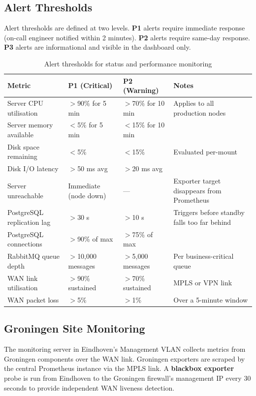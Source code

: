 \subsection{Alert Thresholds}

Alert thresholds are defined at two levels. \textbf{P1} alerts require immediate response (on-call engineer notified within 2 minutes). \textbf{P2} alerts require same-day response. \textbf{P3} alerts are informational and visible in the dashboard only.

\begin{table}[H]
\centering
\begin{tabularx}{\textwidth}{lllX}
\toprule
\textbf{Metric} & \textbf{P1 (Critical)} & \textbf{P2 (Warning)} & \textbf{Notes} \\
\midrule
Server CPU utilisation & $>$90\% for 5 min & $>$70\% for 10 min & Applies to all production nodes \\
Server memory available & $<$5\% for 5 min & $<$15\% for 10 min & \\
Disk space remaining & $<$5\% & $<$15\% & Evaluated per-mount \\
Disk I/O latency & $>$50 ms avg & $>$20 ms avg & \\
Server unreachable & Immediate (node down) & --- & Exporter target disappears from Prometheus \\
PostgreSQL replication lag & $>$30 s & $>$10 s & Triggers before standby falls too far behind \\
PostgreSQL connections & $>$90\% of max & $>$75\% of max & \\
RabbitMQ queue depth & $>$10,000 messages & $>$5,000 messages & Per business-critical queue \\
WAN link utilisation & $>$90\% sustained & $>$70\% sustained & MPLS or VPN link \\
WAN packet loss & $>$5\% & $>$1\% & Over a 5-minute window \\
\bottomrule
\end{tabularx}
\caption{Alert thresholds for status and performance monitoring}
\label{tab:alert-thresholds}
\end{table}

\subsection{Groningen Site Monitoring}

The monitoring server in Eindhoven's Management VLAN collects metrics from Groningen components over the WAN link. Groningen exporters are scraped by the central Prometheus instance via the MPLS link. A \textbf{blackbox exporter} probe is run from Eindhoven to the Groningen firewall's management IP every 30 seconds to provide independent WAN liveness detection.

